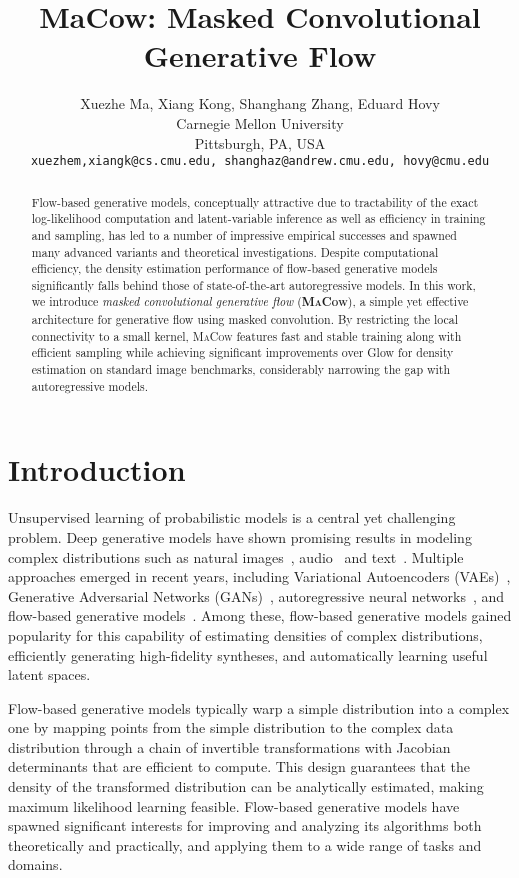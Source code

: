 \documentclass{article}
\title{MaCow: Masked Convolutional Generative Flow}
\author{Xuezhe Ma, Xiang Kong, Shanghang Zhang, Eduard Hovy \\ 
Carnegie Mellon University \\
Pittsburgh, PA, USA \\
\texttt{xuezhem,xiangk@cs.cmu.edu, shanghaz@andrew.cmu.edu, hovy@cmu.edu}
\iffalse
\And Shanghang Zhang \\
Carnegie Mellon University \\
Pittsburgh, PA, USA \\
\texttt{shanghaz@andrew.cmu.edu}
\And 
Eduard Hovy \\
Carnegie Mellon University \\
Pittsburgh, PA, USA \\
\texttt{hovy@cmu.edu}
\fi
}
\begin{document}
\maketitle

\begin{abstract}
Flow-based generative models, conceptually attractive due to tractability of the exact log-likelihood computation and latent-variable inference as well as efficiency in training and sampling, has led to a number of impressive empirical successes and spawned many advanced variants and theoretical investigations.
Despite computational efficiency, the density estimation performance of flow-based generative models significantly falls behind those of state-of-the-art autoregressive models.
In this work, we introduce \emph{masked convolutional generative flow} (\textbf{\textsc{MaCow}}), a simple yet effective architecture for generative flow using masked convolution. 
By restricting the local connectivity to a small kernel, \textsc{MaCow} features fast and stable training along with efficient sampling while achieving significant improvements over Glow for density estimation on standard image benchmarks, considerably narrowing the gap with autoregressive models.
\end{abstract}

\section{Introduction}
Unsupervised learning of probabilistic models is a central yet challenging problem. 
Deep generative models have shown promising results in modeling complex distributions such as natural images~\citep{radford2015unsupervised}, audio~\citep{van2016wavenet} and text~\citep{bowman2015generating}.
Multiple approaches emerged in recent years, including Variational Autoencoders (VAEs)~\citep{kingma2014auto}, Generative Adversarial Networks (GANs)~\citep{goodfellow2014generative}, autoregressive neural networks~\citep{larochelle2011neural,oord2016pixel}, and flow-based generative models~\citep{dinh2014nice,dinh2016density,kingma2018glow}.
Among these, flow-based generative models gained popularity for this capability of estimating densities of complex distributions, efficiently generating high-fidelity syntheses, and automatically learning useful latent spaces.

Flow-based generative models typically warp a simple distribution into a complex one by mapping points from the simple distribution to the complex data distribution through a chain of invertible transformations with Jacobian determinants that are efficient to compute.
This design guarantees that the density of the transformed distribution can be analytically estimated, making maximum likelihood learning feasible.
Flow-based generative models have spawned significant interests for improving and analyzing its algorithms both theoretically and practically, and applying them to a wide range of tasks and domains.
\end{document}
